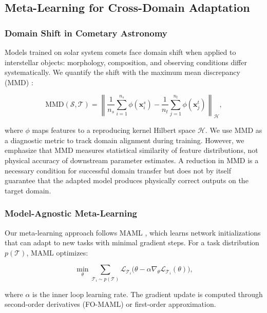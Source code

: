 \documentclass[preprint2]{aastex631}
\begin{document}
\subsection{Meta-Learning for Cross-Domain Adaptation}

\subsubsection{Domain Shift in Cometary Astronomy}

Models trained on solar system comets face domain shift when applied to interstellar objects: morphology, composition, and observing conditions differ systematically. We quantify the shift with the maximum mean discrepancy (MMD) \citep{gretton12}:

\begin{equation}\label{eq:mmd}
\text{MMD}(\mathcal{S}, \mathcal{T}) = \left\| \frac{1}{n_s} \sum_{i=1}^{n_s} \phi(\mathbf{x}_i^s) - \frac{1}{n_t} \sum_{j=1}^{n_t} \phi(\mathbf{x}_j^t) \right\|_{\mathcal{H}},
\end{equation}

where $\phi$ maps features to a reproducing kernel Hilbert space $\mathcal{H}$. We use MMD as a diagnostic metric to track domain alignment during training. However, we emphasize that MMD measures statistical similarity of feature distributions, not physical accuracy of downstream parameter estimates. A reduction in MMD is a necessary condition for successful domain transfer but does not by itself guarantee that the adapted model produces physically correct outputs on the target domain.

\subsubsection{Model-Agnostic Meta-Learning}

Our meta-learning approach follows MAML \citep{finn17}, which learns network initializations that can adapt to new tasks with minimal gradient steps. For a task distribution $p(\mathcal{T})$, MAML optimizes:

\begin{equation}\label{eq:maml}
\min_\theta \sum_{\mathcal{T}_i \sim p(\mathcal{T})}
\mathcal{L}_{\mathcal{T}_i}\bigl(\theta - \alpha \nabla_\theta \mathcal{L}_{\mathcal{T}_i}(\theta)\bigr),
\end{equation}

where $\alpha$ is the inner loop learning rate. The gradient update is computed through second-order derivatives (FO-MAML) or first-order approximation.
\end{document}

